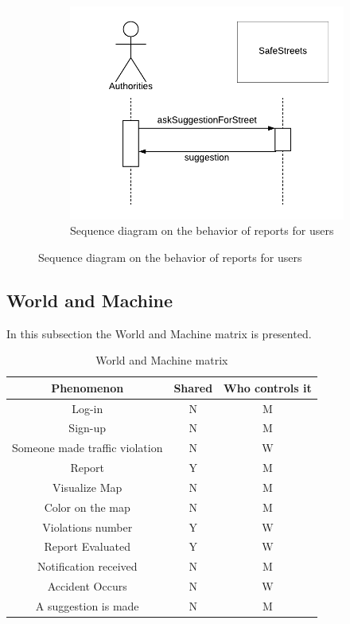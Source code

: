\documentclass[12pt,a4paper]{report}
\begin{document}
			\begin{figure}[H]
				\begin{subfigure}{\textwidth}
					\includegraphics[scale = 0.75, center]{SuggestionSequenceDiagram}
					\caption{Sequence diagram on the behavior of reports for users}
				\end{subfigure}
			\end{figure}

	\subsection{World and Machine}
		In this subsection the World and Machine matrix is presented.
		\begin{table}[H]
			\centering
			\begin{tabular}{|c|c|c|}
				\hline
				Phenomenon & Shared & Who controls it\\
				\hline
				\hline
				Log-in & N & M\\
				\hline
				Sign-up & N & M\\
				\hline
				Someone made traffic violation & N & W\\
				\hline
				Report & Y & M\\
				\hline
				Visualize Map & N & M\\
				\hline
				Color on the map & N & M\\
				\hline
				Violations number & Y & W\\
				\hline
				Report Evaluated & Y & W\\
				\hline
				Notification received & N & M\\
				\hline
				Accident Occurs & N & W\\
				\hline
				A suggestion is made & N & M\\
				\hline
				
				
			\end{tabular}
			\caption{World and Machine matrix}
			\label{tab: }
		\end{table}
	
\end{document}
